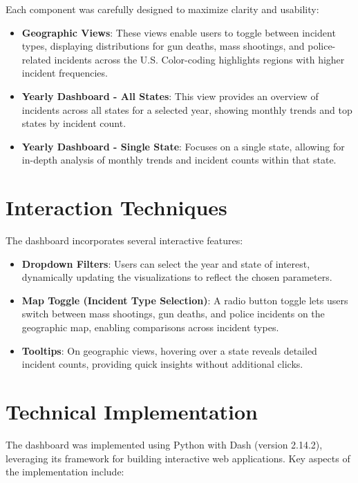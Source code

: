 \documentclass{article}
\begin{document}
Each component was carefully designed to maximize clarity and usability:
\begin{itemize}
    \item \textbf{Geographic Views}: These views enable users to toggle between incident types, displaying distributions for gun deaths, mass shootings, and police-related incidents across the U.S. Color-coding highlights regions with higher incident frequencies.
    \item \textbf{Yearly Dashboard - All States}: This view provides an overview of incidents across all states for a selected year, showing monthly trends and top states by incident count.
    \item \textbf{Yearly Dashboard - Single State}: Focuses on a single state, allowing for in-depth analysis of monthly trends and incident counts within that state.
\end{itemize}

\section{Interaction Techniques}
The dashboard incorporates several interactive features:
\begin{itemize}
    \item \textbf{Dropdown Filters}: Users can select the year and state of interest, dynamically updating the visualizations to reflect the chosen parameters.
    \item \textbf{Map Toggle (Incident Type Selection)}: A radio button toggle lets users switch between mass shootings, gun deaths, and police incidents on the geographic map, enabling comparisons across incident types.
    \item \textbf{Tooltips}: On geographic views, hovering over a state reveals detailed incident counts, providing quick insights without additional clicks.
\end{itemize}

\section{Technical Implementation}
The dashboard was implemented using Python with Dash (version 2.14.2), leveraging its framework for building interactive web applications. Key aspects of the implementation include:
\end{document}
